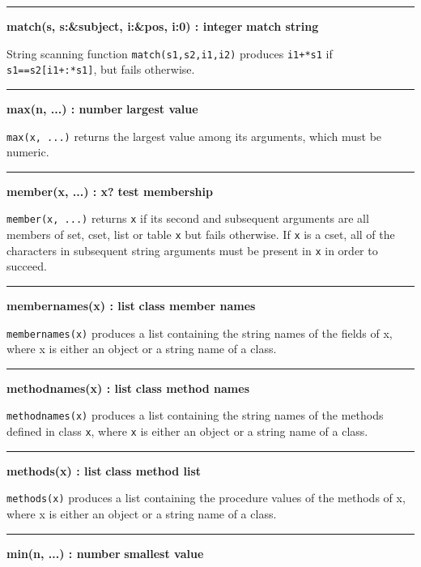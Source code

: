 \bigskip\hrule\vspace{0.1cm}
\noindent
{\bf match(s, s:\&subject, i:\&pos, i:0) : integer } \hfill {\bf match string}

\noindent
{}String scanning function \texttt{match(s1,s2,i1,i2)}
produces \texttt{i1+*s1} if \texttt{s1==s2[i1+:*s1]}, but fails
otherwise.

\bigskip\hrule\vspace{0.1cm}
\noindent
{\bf max(n, ...) : number } \hfill {\bf largest value}

\noindent
{}\texttt{max(x, ...)} returns the largest value among its
arguments, which must be numeric.

\bigskip\hrule\vspace{0.1cm}
\noindent
{\bf member(x, ...) : x? } \hfill {\bf test membership}

\noindent
{}\texttt{member(x, ...)} returns \texttt{x} if its second
and subsequent arguments are all members of set, cset, list or table
\texttt{x} but fails otherwise. If \texttt{x} is a cset, all of the
characters in subsequent string arguments must be present in \texttt{x}
in order to succeed.

\bigskip\hrule\vspace{0.1cm}
\noindent
{\bf membernames(x) : list } \hfill {\bf class member names}

\noindent
\texttt{membernames(x)} produces a list containing the string names of
the fields of x, where x is either an object or a string name of a
class.

\bigskip\hrule\vspace{0.1cm}
\noindent
{\bf methodnames(x) : list } \hfill {\bf class method names}

\noindent
\texttt{methodnames(x)} produces a list containing the string names of
the methods defined in class \texttt{x}, where \texttt{x} is either an
object or a string name of a class.

\bigskip\hrule\vspace{0.1cm}
\noindent
{\bf methods(x) : list } \hfill {\bf class method list}

\noindent
\texttt{methods(x)} produces a list containing the procedure values of
the methods of x, where x is either an object or a string name of a
class.

\bigskip\hrule\vspace{0.1cm}
\noindent
{\bf min(n, ...) : number } \hfill {\bf smallest value}

